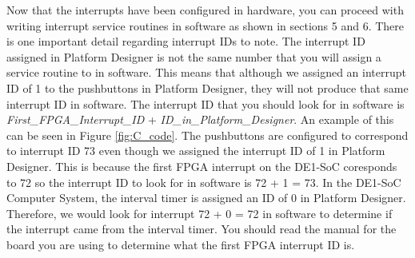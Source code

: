 \documentclass[11pt, twoside, pdftex]{article}
\newcommand{\commonPath}{../../Common}
\begin{document}
Now that the interrupts have been configured in hardware, you can proceed with writing interrupt service routines in software as shown in sections 5 and 6. There is one important detail regarding interrupt IDs to note. The interrupt ID assigned in Platform Designer is not the same number that you will assign a service routine to in software. This means that although we assigned an interrupt ID of 1 to the pushbuttons in Platform Designer, they will not produce that same interrupt ID in software. The interrupt ID that you should look for in software is {\it First{\_}FPGA{\_}Interrupt{\_}ID} + {\it ID{\_}in{\_}Platform{\_}Designer}. An example of this can be seen in Figure \ref{fig:C_code}. The pushbuttons are configured to correspond to interrupt ID 73 even though we assigned the interrupt ID of 1 in Platform Designer. This is because the first FPGA interrupt on the DE1-SoC coresponds to 72 so the interrupt ID to look for in software is 72 + 1 = 73. In the DE1-SoC Computer System, the interval timer is assigned an ID of 0 in Platform Designer. Therefore, we would look for interrupt 72 + 0 = 72 in software to determine if the interrupt came from the interval timer. You should read the manual for the board you are using to determine what the first FPGA interrupt ID is.
\newpage
{}





\newpage
{}







\end{document}
